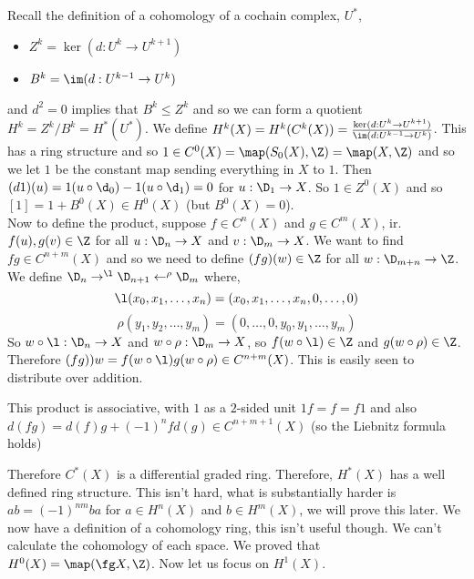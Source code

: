 Recall the definition of a cohomology of a cochain complex, $U^*$,
\begin{itemize}
  \item $Z^k = \ker (d : U^k \to U^{k+1})$
  \item $B^k = \im(d : U^{k-1} \to U^k)$
\end{itemize}
and $d^2 = 0$ implies that $B^k \le Z^k$ and so we can form a quotient $H^k = Z^k / B^k = H^*(U^*)$. We define $H^k(X) = H^k(C^k(X)) = \frac{\ker (d : U^k \to U^{k+1})}{\im(d : U^{k-1} \to U^k)}$. This has a ring structure and so $1 \in C^0(X) = \map(S_0(X), \Z) = \map(X, \Z)$ and so we let $1$ be the constant map sending everything in $X$ to $1$. Then $(d1)(u) = 1(u \circ \d_0) - 1(u \circ \d_1) = 0$ for $u : \D_1 \to X$. So $1 \in Z^0(X)$ and so $[1] = 1 + B^0(X) \in H^0(X)$ (but $B^0(X) = 0$).\\

\noindent
Now to define the product, suppose $f \in C^n(X)$ and $g \in C^m(X)$, ir. $f(u), g(v) \in \Z$ for all $u : \D_n \to X$ and $v : \D_m \to X$. We want to find $fg \in C^{n+m}(X)$ and so we need to define $(fg)(w) \in \Z$ for all $w : \D_{m+n} \to \Z$. We define $\D_{n} \to^{\l} \D_{n+1} \leftarrow^{\rho} \D_m$ where,
$$ \l(x_0, x_1, \dots, x_n) = (x_0, x_1, \dots, x_n, 0, \dots, 0) $$
$$ \rho(y_1, y_2, \dots, y_m) = (0, \dots, 0, y_0, y_1, \dots, y_m) $$
So $w \circ \l : \D_n \to X$ and $w \circ \rho : \D_m \to X$, so $f(w \circ \l) \in \Z$ and $g(w \circ \rho) \in \Z$. Therefore $(fg))w = f(w\circ \l) g(w \circ \rho) \in C^{n+m}(X)$. This is easily seen to distribute over addition.

\begin{exercise}
  This product is associative, with $1$ as a $2$-sided unit $1f = f = f1$ and also $d(fg) = d(f)g + (-1)^n fd(g) \in C^{n+m+1}(X)$ (so the Liebnitz formula holds)
\end{exercise}

\noindent
Therefore $C^*(X)$ is a differential graded ring. Therefore, $H^*(X)$ has a well defined ring structure. This isn't hard, what is substantially harder is $ab = (-1)^{nm}ba$ for $a \in H^n(X)$ and $b \in H^m(X)$, we will prove this later. We now have a definition of a cohomology ring, this isn't useful though. We can't calculate the cohomology of each space. We proved that $H^0(X) = \map (\fg X, \Z)$. Now let us focus on $H^1(X)$.\\

